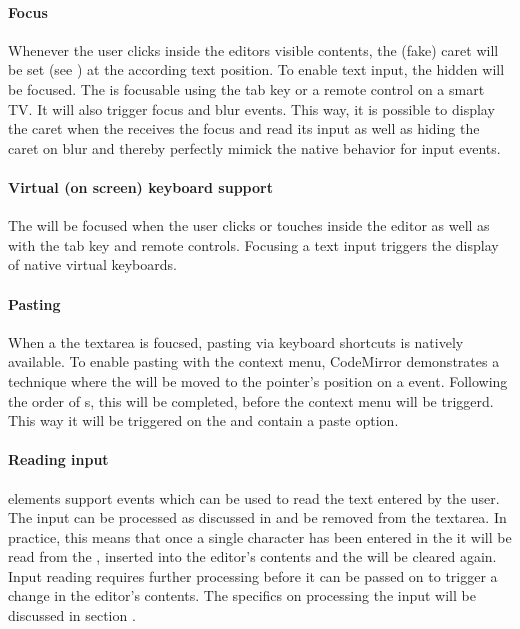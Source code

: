 \paragraph{Focus} Whenever the user clicks inside the editors visible contents, the (fake) caret will be set (see ) at the according text position. To enable text input, the hidden  will be focused. The  is focusable using the tab key or a remote control on a smart TV. It will also trigger focus and blur events. This way, it is possible to display the caret when the  receives the focus and read its input as well as hiding the caret on blur and thereby perfectly mimick the native behavior for input events.

\paragraph{Virtual (on screen) keyboard support} The  will be focused when the user clicks or touches inside the editor as well as with the tab key and remote controls. Focusing a text input triggers the display of native virtual keyboards.

\paragraph{Pasting} When a the textarea is foucsed, pasting via keyboard shortcuts is natively available. To enable pasting with the context menu, CodeMirror demonstrates a technique where the  will be moved to the pointer's position on a  event. Following the order of s, this will be completed, before the context menu will be triggerd. This way it will be triggered on the  and contain a paste option.

\paragraph{Reading input}  elements support  events which can be used to read the text entered by the user. The input can be processed as discussed in  and be removed from the textarea. In practice, this means that once a single character has been entered in the  it will be read from the , inserted into the editor's contents and the  will be cleared again. Input reading requires further processing before it can be passed on to trigger a change in the editor's contents. The specifics on processing the input will be discussed in section .

